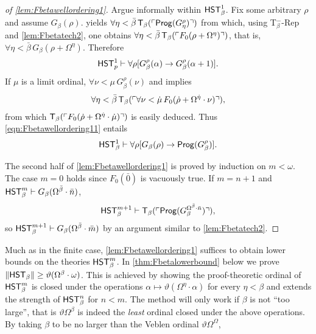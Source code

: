 \documentclass[UKenglish,cleveref,DIV=12]{scrartcl}
\theoremstyle{definition}
\theoremstyle{definition}
\begin{document}
\begin{proof}[of \cref{lem:Fbetawellordering1}]
Argue informally within $\mathsf{HST}_\beta^1$. Fix some arbitrary $\rho$ and assume $G_\beta(\rho)$.
 yields $\forall\eta<\bar\beta\,\mathsf{T}_\beta(\ulcorner{\mathsf{Prog}(G_\eta^\rho)}\urcorner)$ from which, using T$^-_\beta$-Rep and \cref{lem:Fbetatech2},
one obtains
  $\forall\eta<\bar\beta\,\mathsf{T}_\beta(\ulcorner{F_0(\rho+\Omega^\eta)}\urcorner)$,
that is, $\forall\eta<\bar\beta\,G_\beta(\rho+\Omega^\eta)$. Therefore
\begin{align}\label{eqn:Fbetawellordering11}
 \mathsf{HST}_p^1\vdash\forall\rho[G_\beta^\rho(\alpha)\rightarrow G_\beta^\rho(\alpha+1)].
\end{align}
If $\mu$ is a limit ordinal, $\forall\nu<\mu\,G_\beta^\rho(\nu)$ and
\Uni\beta implies
\begin{align*}
\forall\eta<\bar\beta\,\mathsf{T}_\beta(\ulcorner{\forall\nu<\dot\mu\,F_0(\dot\rho+\Omega^{\dot\eta}
\cdot\nu)}\urcorner),
\end{align*}
from which $\mathsf{T}_\beta(\ulcorner{F_0(\dot\rho+\Omega^{\dot\eta}\cdot\dot\mu)}\urcorner)$ is easily
deduced. Thus \eqref{eqn:Fbetawellordering11} entails
\begin{align*}
 \mathsf{HST}_\beta^1\vdash\forall\rho[G_\beta(\rho)\rightarrow \mathsf{Prog}( G_\beta^\rho)].
\end{align*}

The second half of \cref{lem:Fbetawellordering1} is proved by induction on $m<\omega$. The case $m=0$ holds since $F_0(\bar0)$ is vacuously true. If $m=n+1$ and $\mathsf{HST}_\beta^m\vdash G_\beta(\Omega^{\bar\beta}\cdot\bar n)$,
\begin{align*}
 \mathsf{HST}_\beta^{m+1}\vdash \mathsf{T}_\beta(\ulcorner{\mathsf{Prog}(G_\beta^{\Omega^{\bar\beta}\cdot\bar n})}\urcorner),
\end{align*}
so $\mathsf{HST}_\beta^{m+1}\vdash G_\beta(\Omega^{\bar\beta}\cdot\bar m)$ by an argument similar to \cref{lem:Fbetatech2}.
%
\end{proof}
Much as in the finite case, \cref{lem:Fbetawellordering1} suffices to obtain
lower bounds on the theories $\mathsf{HST}_\beta^m$. In \cref{thm:Fbetalowerbound}
below we prove $\lVert{\mathsf{HST}_\beta}\rVert\ge\vartheta(\Omega^\beta\cdot\omega)$. This is
achieved by showing the proof-theoretic ordinal of $\mathsf{HST}_\beta^m$ is closed under
the operations $\alpha\mapsto\vartheta(\Omega^\eta\cdot\alpha)$ for every
$\eta<\beta$ and extends the strength of $\mathsf{HST}_\beta^n$ for $n<m$. The method will
only work if $\beta$ is not ``too large'', that is $\vartheta\Omega^\beta$ is
indeed the \emph{least} ordinal closed under the above operations. By taking
$\beta$ to be no larger than the Veblen ordinal $\vartheta\Omega^\Omega$,
\end{document}
